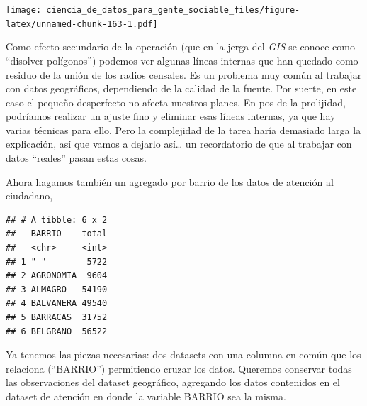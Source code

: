 \documentclass[spanish,]{book}
\newenvironment{Shaded}{\begin{snugshade}}{\end{snugshade}}
\newcommand{\DataTypeTok}[1]{\textcolor[rgb]{0.13,0.29,0.53}{#1}}
\newcommand{\KeywordTok}[1]{\textcolor[rgb]{0.13,0.29,0.53}{\textbf{#1}}}
\newcommand{\NormalTok}[1]{#1}
\newcommand{\OperatorTok}[1]{\textcolor[rgb]{0.81,0.36,0.00}{\textbf{#1}}}
\newcommand{\StringTok}[1]{\textcolor[rgb]{0.31,0.60,0.02}{#1}}
\begin{document}
\texttt{[image: ciencia\_de\_datos\_para\_gente\_sociable\_files/figure-latex/unnamed-chunk-163-1.pdf]}

Como efecto secundario de la operación (que en la jerga del \emph{GIS} se conoce como ``disolver polígonos'') podemos ver algunas líneas internas que han quedado como residuo de la unión de los radios censales. Es un problema muy común al trabajar con datos geográficos, dependiendo de la calidad de la fuente. Por suerte, en este caso el pequeño desperfecto no afecta nuestros planes. En pos de la prolijidad, podríamos realizar un ajuste fino y eliminar esas líneas internas, ya que hay varias técnicas para ello. Pero la complejidad de la tarea haría demasiado larga la explicación, así que vamos a dejarlo así\ldots{} un recordatorio de que al trabajar con datos ``reales'' pasan estas cosas.

Ahora hagamos también un agregado por barrio de los datos de atención al ciudadano,

\begin{Shaded}
\end{Shaded}

\begin{verbatim}
## # A tibble: 6 x 2
##   BARRIO    total
##   <chr>     <int>
## 1 " "        5722
## 2 AGRONOMIA  9604
## 3 ALMAGRO   54190
## 4 BALVANERA 49540
## 5 BARRACAS  31752
## 6 BELGRANO  56522
\end{verbatim}

Ya tenemos las piezas necesarias: dos datasets con una columna en común que los relaciona (``BARRIO'') permitiendo cruzar los datos. Queremos conservar todas las observaciones del dataset geográfico, agregando los datos contenidos en el dataset de atención en donde la variable BARRIO sea la misma.

\begin{Shaded}
\end{Shaded}
\end{document}
